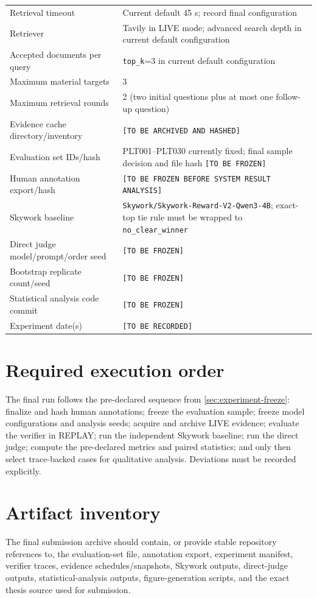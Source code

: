 \begin{longtable}{p{4.6cm}p{9.0cm}}
Retrieval timeout & Current default 45 s; record final configuration \\
Retriever & Tavily in LIVE mode; advanced search depth in current default configuration \\
Accepted documents per query & \texttt{top\_k}=3 in current default configuration \\
Maximum material targets & 3 \\
Maximum retrieval rounds & 2 (two initial questions plus at most one follow-up question) \\
Evidence cache directory/inventory & \texttt{[TO BE ARCHIVED AND HASHED]} \\
Evaluation set IDs/hash & PLT001--PLT030 currently fixed; final sample decision and file hash \texttt{[TO BE FROZEN]} \\
Human annotation export/hash & \texttt{[TO BE FROZEN BEFORE SYSTEM RESULT ANALYSIS]} \\
Skywork baseline & \texttt{Skywork/Skywork-Reward-V2-Qwen3-4B}; exact-top tie rule must be wrapped to \texttt{no\_clear\_winner} \\
Direct judge model/prompt/order seed & \texttt{[TO BE FROZEN]} \\
Bootstrap replicate count/seed & \texttt{[TO BE FROZEN]} \\
Statistical analysis code commit & \texttt{[TO BE FROZEN]} \\
Experiment date(s) & \texttt{[TO BE RECORDED]} \\
\bottomrule
\end{longtable}

\section*{Required execution order}
The final run follows the pre-declared sequence from \cref{sec:experiment-freeze}: finalize and hash human annotations; freeze the evaluation sample; freeze model configurations and analysis seeds; acquire and archive LIVE evidence; evaluate the verifier in REPLAY; run the independent Skywork baseline; run the direct judge; compute the pre-declared metrics and paired statistics; and only then select trace-backed cases for qualitative analysis. Deviations must be recorded explicitly.

\section*{Artifact inventory}
The final submission archive should contain, or provide stable repository references to, the evaluation-set file, annotation export, experiment manifest, verifier traces, evidence schedules/snapshots, Skywork outputs, direct-judge outputs, statistical-analysis outputs, figure-generation scripts, and the exact thesis source used for submission.

